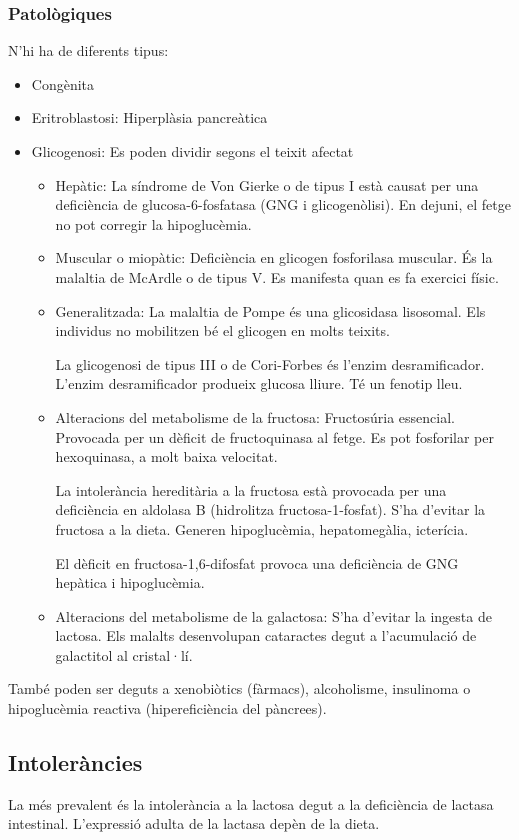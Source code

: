 \subsubsection{Patològiques}
\label{sec:patologiques}
N'hi ha de diferents tipus:
\begin{itemize}
\item Congènita
\item Eritroblastosi: Hiperplàsia pancreàtica
\item Glicogenosi: Es poden dividir segons el teixit afectat
  \begin{itemize}
  \item Hepàtic: La síndrome de Von Gierke o de tipus I està causat per una
    deficiència de glucosa-6-fosfatasa (GNG i glicogenòlisi). En
    dejuni, el fetge no pot corregir la hipoglucèmia.

  \item Muscular o miopàtic: Deficiència en glicogen fosforilasa muscular. És la
    malaltia de McArdle o de tipus V. Es manifesta quan es fa exercici
    físic.

  \item Generalitzada: La malaltia de Pompe és una glicosidasa
    lisosomal. Els individus no mobilitzen bé el glicogen en molts
    teixits.

La glicogenosi de tipus III o de Cori-Forbes és l'enzim
desramificador. L'enzim desramificador produeix glucosa lliure. Té un
fenotip lleu.

\item Alteracions del metabolisme de la fructosa: Fructosúria
  essencial. Provocada per un dèficit de fructoquinasa al fetge. Es
  pot fosforilar per hexoquinasa, a molt baixa velocitat.

La intolerància hereditària a la fructosa està provocada per una
deficiència en aldolasa B (hidrolitza fructosa-1-fosfat). S'ha
d'evitar la fructosa a la dieta. Generen hipoglucèmia, hepatomegàlia,
icterícia.

El dèficit en fructosa-1,6-difosfat provoca una deficiència de GNG
hepàtica i hipoglucèmia.  

\item Alteracions del metabolisme de la galactosa: S'ha d'evitar la
  ingesta de lactosa. Els malalts desenvolupan cataractes degut a
  l'acumulació de galactitol al cristal·lí.
  \end{itemize}
\end{itemize}

També poden ser deguts a xenobiòtics (fàrmacs), alcoholisme,
insulinoma o hipoglucèmia reactiva (hipereficiència del pàncrees).

\subsection{Intoleràncies}
\label{sec:intolerancies}
La més prevalent és la intolerància a la lactosa degut a la
deficiència de lactasa intestinal. L'expressió adulta de la lactasa
depèn de la dieta.